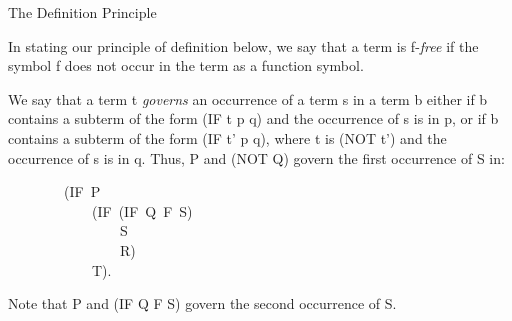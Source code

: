 \documentclass[11pt]{book}
\newenvironment{pubasis}{\begin{flushleft}\ttfamily\small}{\normalsize\rmfamily\end{flushleft}}
\newcommand{\pubinlineunderline}[1]{\emph{#1}}
\begin{document}
\par\pagebreak[0]\hrulefill\nopagebreak\par
\begin{center}
The Definition Principle
\end{center}

In stating our principle of definition below, we  say that
a term is f-\pubinlineunderline{free} if the symbol f does not occur in the term as
a function symbol.

We say that a term t \pubinlineunderline{governs} an occurrence of a term s
in a term b either if b contains a subterm of the form (IF t p q)
and the occurrence of s is in p, or if b contains a subterm of the form
(IF t' p q), where t is (NOT t')
and the occurrence of s is in q.  Thus, P and (NOT Q) govern the first
occurrence of S in:
\begin{pubasis}
~~~~~~~~(IF~P\\
~~~~~~~~~~~~(IF~(IF~Q~F~S)\\
~~~~~~~~~~~~~~~~S\\
~~~~~~~~~~~~~~~~R)\\
~~~~~~~~~~~~T).\\
\end{pubasis}
Note that P and (IF Q F S) govern the second occurrence of S.
\end{document}
